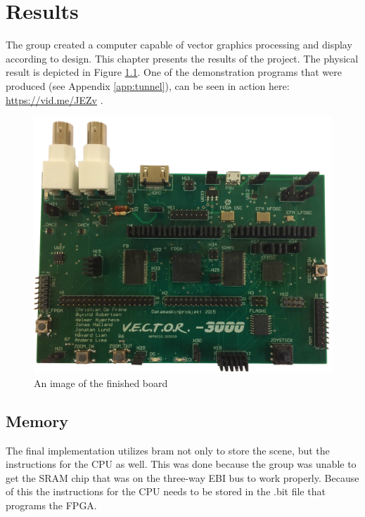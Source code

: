 \chapter{Results}

The group created a computer capable of vector graphics processing and display according to design.
This chapter presents the results of the project.
The physical result is depicted in Figure \ref{fig:board-top}.
One of the demonstration programs that were produced (see Appendix \ref{app:tunnel}), can be seen in action here: \href{https://vid.me/JEZv}{https://vid.me/JEZv} \cite{tunnel-demo}.

\begin{figure}[h!]
	    \includegraphics[width=\linewidth]{images/board_top.jpg}
	    \caption{An image of the finished \vthreek board}
	    \label{fig:board-top}
\end{figure}

\section{Memory}

The final implementation utilizes \gls{bram} not only to store the scene, but the instructions for the CPU as well.
This was done because the group was unable to get the SRAM chip that was on the three-way EBI bus to work properly.
Because of this the instructions for the CPU needs to be stored in the .bit file that programs the FPGA.

